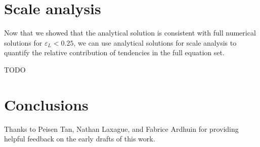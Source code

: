 \documentclass[draft]{agujournal2019}
\begin{document}
\section{Scale analysis}
\label{section:scale_analysis}

Now that we showed that the analytical solution is consistent with full numerical
solutions for $\varepsilon_L < 0.25$, we can use analytical solutions for scale
analysis to quantify the relative contribution of tendencies in the full equation set.

TODO

\section{Conclusions}
\label{section:conclusions}

\acknowledgments
Thanks to Peisen Tan, Nathan Laxague, and Fabrice Ardhuin for providing helpful
feedback on the early drafts of this work.


\end{document}

